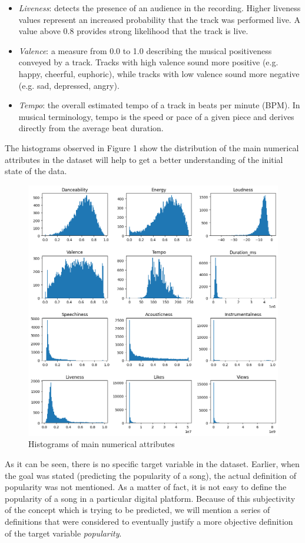 \documentclass[11pt]{article} %
\begin{document}
\begin{itemize}
	\item \textit{Liveness}: detects the presence of an audience in the recording. Higher liveness values represent an increased probability that the track was performed live. A value above 0.8 provides strong likelihood that the track is live.
	\item \textit{Valence}: a measure from 0.0 to 1.0 describing the musical positiveness conveyed by a track. Tracks with high valence sound more positive (e.g. happy, cheerful, euphoric), while tracks with low valence sound more negative (e.g. sad, depressed, angry).
	\item \textit{Tempo}: the overall estimated tempo of a track in beats per minute (BPM). In musical terminology, tempo is the speed or pace of a given piece and derives directly from the average beat duration.
\end{itemize}

The histograms observed in Figure 1 show the distribution of the main numerical attributes in the dataset will help to get a better understanding of the initial state of the data.
\begin{figure}[ht]
	\centering
	\includegraphics[width=.8\linewidth]{numeric_variables_histograms.png}
	\caption{Histograms of main numerical attributes}\label{fig:numeric_variables_histograms}
\end{figure}

As it can be seen, there is no specific target variable in the dataset. Earlier, when the goal was stated (predicting the popularity of a song), the actual definition of popularity was not mentioned. As a matter of fact, it is not easy to define the popularity of a song in a particular digital platform.
Because of this subjectivity of the concept which is trying to be predicted, we will mention a series of definitions that were considered to eventually justify a more objective definition of the target variable \textit{popularity}.
\end{document}
